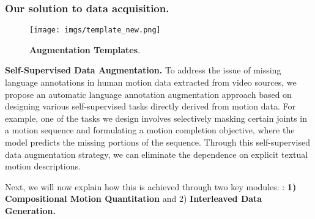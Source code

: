 


\subsubsection{Our solution to data acquisition.}
\begin{figure*}
  \centering
   \texttt{[image: imgs/template\_new.png]}
   \caption{\textbf{Augmentation Templates}. }
   \label{fig:templtes}
\end{figure*}

\textbf{Self-Supervised Data Augmentation. }
To address the issue of missing language annotations in human motion data extracted from video sources, we propose an automatic language annotation augmentation approach based on designing various self-supervised tasks directly derived from motion data.
For example, one of the tasks we design involves selectively masking certain joints in a motion sequence and formulating a motion completion objective, where the model predicts the missing portions of the sequence.
Through this self-supervised data augmentation strategy, we can eliminate the dependence on explicit textual motion descriptions.

Next, we will now explain how this is achieved through two key modules:
: \textbf{1) Compositional Motion Quantitation} and 2) \textbf{Interleaved Data Generation.}

